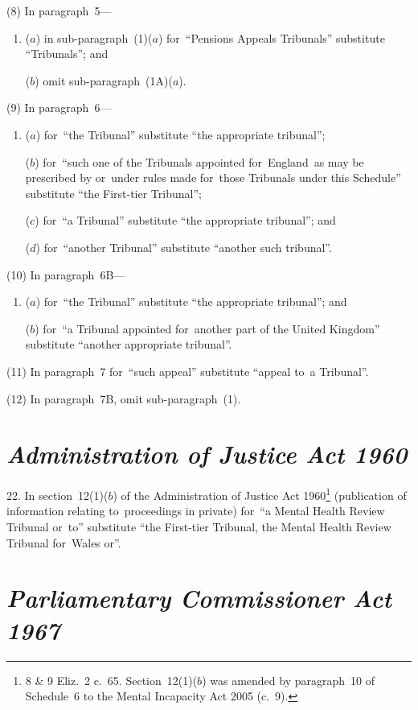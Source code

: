\documentclass[12pt,a4paper]{article}
\begin{document}
(8) In paragraph~5—
\begin{enumerate}\item[]
($a$) in sub-paragraph~(1)($a$)  for~“Pensions Appeals Tribunals” substitute “Tribunals”; and

($b$) omit sub-paragraph~(1A)($a$).
\end{enumerate}

(9) In paragraph~6—
\begin{enumerate}\item[]
($a$) for~“the Tribunal” substitute “the appropriate tribunal”;

($b$) for~“such one of the Tribunals appointed for~England~as may be prescribed by or~under rules made for~those Tribunals under this Schedule” substitute “the First-tier Tribunal”;

($c$) for~“a Tribunal” substitute “the appropriate tribunal”; and

($d$) for~“another Tribunal” substitute “another such tribunal”.
\end{enumerate}

(10) In paragraph~6B—
\begin{enumerate}\item[]
($a$) for~“the Tribunal” substitute “the appropriate tribunal”; and

($b$) for~“a Tribunal appointed for~another part of the United Kingdom” substitute “another appropriate tribunal”.
\end{enumerate}

(11) In paragraph~7 for~“such appeal” substitute “appeal to~a Tribunal”.

(12) In paragraph~7B, omit sub-paragraph~(1).

\section*{\itshape Administration of Justice Act 1960}

22.  In section~12(1)($b$)  of the Administration of Justice Act 1960\footnote{8 \& 9 Eliz.~2 c.~65. Section~12(1)($b$) was amended by paragraph~10 of Schedule~6 to the Mental Incapacity Act 2005 (c.~9).} (publication of information relating to~proceedings in private) for~“a Mental Health Review Tribunal or~to” substitute “the First-tier Tribunal, the Mental Health Review Tribunal for~Wales or”.

\section*{\itshape Parliamentary Commissioner Act 1967}
\end{document}
